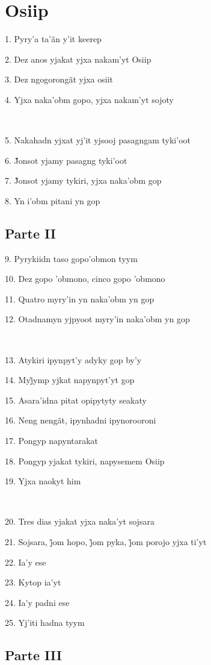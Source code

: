 \chapter*{Osiip}

1. Pyry'a ta'ãn y'it keerep

2. Dez anos yjakat yjxa nakam'yt Osiip

3. Dez ngogorongãt yjxa osiit

4. Yjxa naka'obm gopo, yjxa nakam'yt sojoty

~

5. Nakahadn yjxat yj'it yjsooj pasagngam tyki'oot

6. J̃onsot yjamy pasagng tyki’oot

7. J̃onsot yjamy tykiri, yjxa naka’obm gop

8. Yn i’obm pitani yn gop

\section{Parte II}

9. Pyrykiidn taso gopo'obmon tyym

10. Dez gopo 'obmono, cinco gopo 'obmono

11. Quatro myry'in yn naka'obm yn gop

12. Otadnamyn yjpyoot myry'in naka'obm yn gop

~

13. Atykiri ipynpyt'y adyky gop by'y

14. Myj̃ymp yjkat napynpyt’yt gop

15. Asara'idna pitat opipytyty seakaty

16. Neng nengãt, ipynhadni ipynorooroni

17. Pongyp napyntarakat

18. Pongyp yjakat tykiri, napysemem Osiip

19. Yjxa naokyt him

~

20. Tres dias yjakat yjxa naka'yt sojsara

21. Sojsara, j̃om hopo, j̃om pyka, j̃om porojo yjxa ti’yt

22. Ia'y ese

23. Kytop ia'yt

24. Ia'y padni ese

25. Yj'iti hadna tyym

\section{Parte III}

